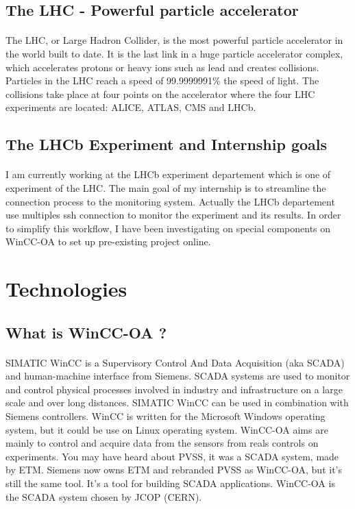 \documentclass[a4paper, 10pt]{article}
\begin{document}
\subsection{The LHC - Powerful particle accelerator}
\paragraph{}
The LHC, or Large Hadron Collider, is the most powerful particle accelerator in the world built to date. 
It is the last link in a huge particle accelerator complex, which accelerates protons or heavy ions such as lead and creates collisions. 
Particles in the LHC reach a speed of 99.9999991\% the speed of light. 
The collisions take place at four points on the accelerator where the four LHC experiments are located: ALICE, ATLAS, CMS and LHCb.

\subsection{The LHCb Experiment and Internship goals}
\paragraph{}
I am currently working at the LHCb experiment departement which is one of experiment of the LHC.
The main goal of my internship is to streamline the connection process to the monitoring system. 
Actually the LHCb departement use multiples ssh connection to monitor the experiment and its results. 
In order to simplify this workflow, I have been investigating on special components on WinCC-OA to set up pre-existing project online.

\section{Technologies}
\subsection{What is WinCC-OA ?}
\paragraph{}
SIMATIC WinCC is a Supervisory Control And Data Acquisition (aka SCADA) and human-machine interface from Siemens. 
SCADA systems are used to monitor and control physical processes involved in industry and infrastructure on a large scale and over long distances. 
SIMATIC WinCC can be used in combination with Siemens controllers. 
WinCC is written for the Microsoft Windows operating system, but it could be use on Linux operating system. 
WinCC-OA aims are mainly to control and acquire data from the sensors from reals controls on experiments.
You may have heard about PVSS, it was a SCADA system, made by ETM. 
Siemens now owns ETM and rebranded PVSS as WinCC-OA, but it's still the same tool. 
It's a tool for building SCADA applications. WinCC-OA is the SCADA system chosen by JCOP (CERN).
\end{document}
